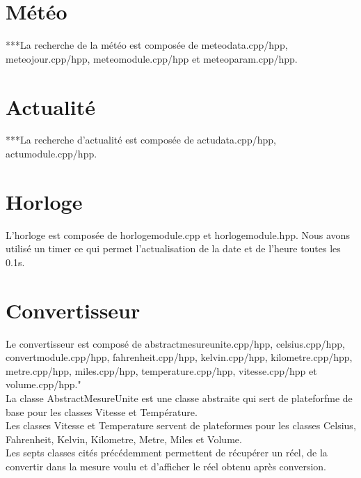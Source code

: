\documentclass[12pt]{report}
\begin{document}
  \section{Météo}
    ***La recherche de la météo est composée de meteodata.cpp/hpp, meteojour.cpp/hpp, meteomodule.cpp/hpp et meteoparam.cpp/hpp.\\
  \section{Actualité}
    ***La recherche d'actualité est composée de actudata.cpp/hpp, actumodule.cpp/hpp.\\
  \section{Horloge}
    L'horloge est composée de horlogemodule.cpp et horlogemodule.hpp. Nous avons utilisé un timer ce qui permet l'actualisation de la date et de l'heure toutes les 0.1s.\\
  \section{Convertisseur}
    Le convertisseur est composé de abstractmesureunite.cpp/hpp, celsius.cpp/hpp, convertmodule.cpp/hpp, fahrenheit.cpp/hpp, kelvin.cpp/hpp, kilometre.cpp/hpp, metre.cpp/hpp, miles.cpp/hpp, temperature.cpp/hpp, vitesse.cpp/hpp et volume.cpp/hpp."\\
    La classe AbstractMesureUnite est une classe abstraite qui sert de plateforfme de base pour les classes Vitesse et Température.\\
    Les classes Vitesse et Temperature servent de plateformes pour les classes Celsius, Fahrenheit, Kelvin, Kilometre, Metre, Miles et Volume.\\
    Les septs classes cités précédemment permettent de récupérer un réel, de la convertir dans la mesure voulu et d'afficher le réel obtenu après conversion.
\end{document}
